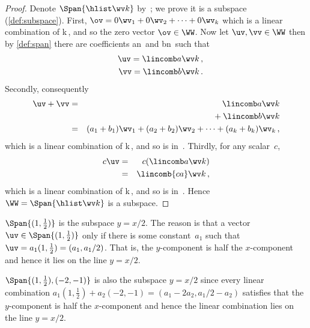 \begin{proof}
Denote \(\Span\{\hlist\wv k\}\) by~\WW; we prove it is a subspace (\cref{def:subspace}).
First, \(\ov=0\wv_1+0\wv_2+\cdots+0\wv_k\) which is a linear combination of \hlist\wv k\,, and so the zero vector \(\ov\in\WW\).
Now let \(\uv,\vv\in\WW\) then by \cref{def:span} there are coefficients \hlist an\ and \hlist bn\ such that
\begin{eqnarray*}
&&\uv=\lincomb a\wv k\,,
\\&&\vv=\lincomb b\wv k\,.
\end{eqnarray*}
Secondly, consequently
\begin{eqnarray*}
\uv+\vv&=&
\lincomb a\wv k
\\&&{}+\lincomb b\wv k
\\&=&(a_1+b_1)\wv_1+(a_2+b_2)\wv_2+\cdots+(a_k+b_k)\wv_k\,,
\end{eqnarray*}
which is a linear combination of \hlist\wv k\,, and so is in~\WW.
Thirdly, for any scalar~\(c\),
\begin{eqnarray*}
c\uv&=&c(\lincomb a\wv k)
\\&=&\lincomb {ca}\wv k\,,
\end{eqnarray*}
which is a linear combination of \hlist\wv k\,, and so is in~\WW.
Hence \(\WW=\Span\{\hlist\wv k\}\) is a subspace.
\end{proof}


\begin{example} \label{eg:1x2subs}
\(\Span\{(1,\frac12)\}\) is the subspace \(y=x/2\).
The reason is that a vector \(\uv\in\Span\{(1,\frac12)\}\) only if there is some constant~\(a_1\) such that \(\uv=a_1(1,\frac12)=(a_1,a_1/2)\).
That is, the \(y\)-component is half the \(x\)-component and hence it lies on the line \(y=x/2\).

\(\Span\{(1,\frac12),(-2,-1)\}\) is also the subspace \(y=x/2\) since every linear combination \(a_1(1,\frac12)+a_2(-2,-1)=(a_1-2a_2,a_1/2-a_2)\) satisfies that the \(y\)-component is half the \(x\)-component and hence the linear combination lies on the line \(y=x/2\).
\end{example}


